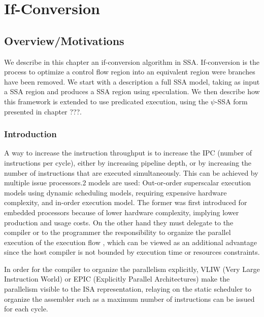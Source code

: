 \chapter{If-Conversion }
\graphicspath{{img/}{if_conversion/img/}{part4/if_conversion/img/}}
	
\newcommand\cond{~?~}


\section{Overview/Motivations}

We describe in this chapter an if-conversion algorithm in SSA. If-conversion is the process to optimize a control flow region into an equivalent region were branches have been removed. We start with a description a full SSA model, taking as input a SSA region and produces a SSA region using speculation. We then describe how this framework is extended to use predicated execution, using the $\psi$-SSA form presented in chapter ???. 

\subsection{Introduction}

A way to increase the instruction throughput is to increase the IPC (number of instructions per cycle), either by increasing pipeline depth, or by increasing the number of instructions that are executed simultaneously. This can be achieved by multiple issue processors.2 models are used: Out-or-order superscalar execution models using dynamic scheduling models, requiring expensive hardware complexity, and in-order execution model. The former was first introduced for embedded processors because of lower hardware complexity, implying lower production and usage costs. On the other hand they must delegate to the compiler or to the programmer the responsibility to organize the parallel execution of the execution flow \cite{Rau:2003:IP:1074100.1074489}, which can be viewed as an additional advantage since the host compiler is not bounded by execution time or resources constraints. 

In order for the compiler to organize the parallelism explicitly, VLIW (Very Large Instruction World) or EPIC (Explicitly Parallel Architectures) make the parallelism visible to the ISA representation, relaying on the static scheduler to organize the assembler such as a maximum number of instructions can be issued for each cycle. 

